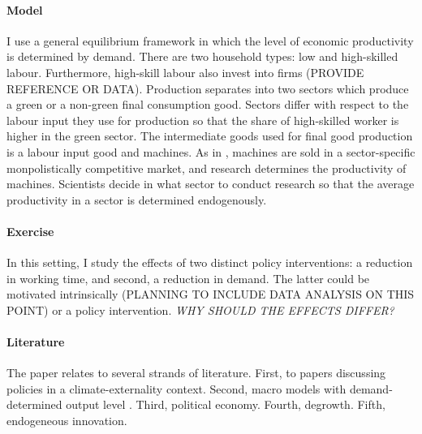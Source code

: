 \paragraph{Model}
I use a general equilibrium framework in which the level of economic productivity is determined by demand. There are two household types: low and high-skilled labour. Furthermore, high-skill labour also invest into firms (PROVIDE REFERENCE OR DATA). Production separates into two sectors which produce a green or a non-green final consumption good. Sectors differ with respect to the labour input they use for production so that the share of high-skilled worker is higher in the green sector. The intermediate goods used for final good production is a labour input good and machines. As in \cite{Acemoglu2012TheChange}, machines are sold in a sector-specific monpolistically competitive market, and research determines the productivity of machines. Scientists decide in what sector to conduct research so that the average productivity in a sector is determined endogenously.

\paragraph{Exercise}
In this setting, I study the effects of two distinct policy interventions: a reduction in working time, and second, a reduction in demand. The latter could be motivated intrinsically (PLANNING TO INCLUDE DATA ANALYSIS ON THIS POINT) or a policy intervention. \textit{WHY SHOULD THE EFFECTS DIFFER?}

\begin{comment}
\paragraph{Potential consequences of the paper and how it could lead to learn about the ability of the market to comply with climate goals}

\textit{I might find that, under the assumption that recomposition alone is not sufficient and a reduction in consumption becomes necessary, a reduction in output might impede technological change so much that the market solution is not feasible \ar motivates to think about accompanying policies.}

content...
\end{comment}


\paragraph{Literature}
The paper relates to several strands of literature. First, to papers discussing policies in a climate-externality context. 
Second, macro models with demand-determined output level \citep{Auerbach2021InequalityEconomyb} \cite{Michaillat2015AggregateUnemployment}.
Third, political economy. 
Fourth, degrowth. 
Fifth, endogeneous innovation. 